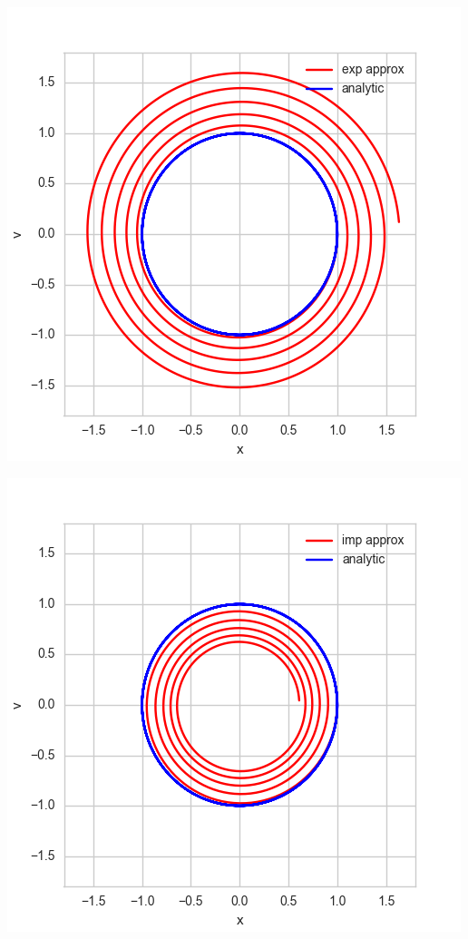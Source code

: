 \documentclass[12pt, letterpaper]{article}
\begin{document}
\begin{center}
\includegraphics[scale=0.8]{expPhaseSpace.png}
\end{center}

\begin{center}
\includegraphics[scale=0.8]{impPhaseSpace.png}
\end{center}
\end{document}
